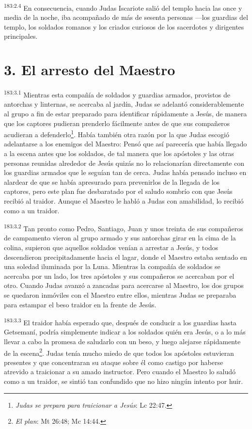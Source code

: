 \par
\textsuperscript{183:2.4} En consecuencia, cuando Judas Iscariote salió del templo hacia las once y media de la noche, iba acompañado de más de sesenta personas ---los guardias del templo, los soldados romanos y los criados curiosos de los sacerdotes y dirigentes principales.

\section*{3. El arresto del Maestro}
\par
\textsuperscript{183:3.1} Mientras esta compañía de soldados y guardias armados, provistos de antorchas y linternas, se acercaba al jardín, Judas se adelantó considerablemente al grupo a fin de estar preparado para identificar rápidamente a Jesús, de manera que los captores pudieran prenderlo fácilmente antes de que sus compañeros acudieran a defenderlo\footnote{\textit{Judas se prepara para traicionar a Jesús}: Lc 22:47.}. Había también otra razón por la que Judas escogió adelantarse a los enemigos del Maestro: Pensó que así parecería que había llegado a la escena antes que los soldados, de tal manera que los apóstoles y las otras personas reunidas alrededor de Jesús quizás no lo relacionarían directamente con los guardias armados que le seguían tan de cerca. Judas había pensado incluso en alardear de que se había apresurado para prevenirlos de la llegada de los captores, pero este plan fue desbaratado por el saludo sombrío con que Jesús recibió al traidor. Aunque el Maestro le habló a Judas con amabilidad, lo recibió como a un traidor.

\par
\textsuperscript{183:3.2} Tan pronto como Pedro, Santiago, Juan y unos treinta de sus compañeros de campamento vieron al grupo armado y sus antorchas girar en la cima de la colina, supieron que aquellos soldados venían a arrestar a Jesús, y todos descendieron precipitadamente hacia el lagar, donde el Maestro estaba sentado en una soledad iluminada por la Luna. Mientras la compañía de soldados se acercaba por un lado, los tres apóstoles y sus compañeros se acercaban por el otro. Cuando Judas avanzó a zancadas para acercarse al Maestro, los dos grupos se quedaron inmóviles con el Maestro entre ellos, mientras Judas se preparaba para estampar el beso traidor en la frente de Jesús.

\par
\textsuperscript{183:3.3} El traidor había esperado que, después de conducir a los guardias hasta Getsemaní, podría simplemente indicar a los soldados quién era Jesús, o a lo más llevar a cabo la promesa de saludarlo con un beso, y luego alejarse rápidamente de la escena\footnote{\textit{El plan}: Mt 26:48; Mc 14:44.}. Judas tenía mucho miedo de que todos los apóstoles estuvieran presentes y que concentraran su ataque sobre él como castigo por haberse atrevido a traicionar a su amado instructor. Pero cuando el Maestro lo saludó como a un traidor, se sintió tan confundido que no hizo ningún intento por huir.

